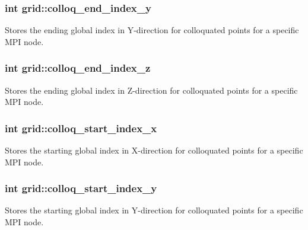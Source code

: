 \subsubsection[{\texorpdfstring{colloq\+\_\+end\+\_\+index\+\_\+y}{colloq_end_index_y}}]{\setlength{\rightskip}{0pt plus 5cm}int grid\+::colloq\+\_\+end\+\_\+index\+\_\+y}\hypertarget{classgrid_abb0480cb2d7fbb17a95502925d706731}{}\label{classgrid_abb0480cb2d7fbb17a95502925d706731}
Stores the ending global index in Y-\/direction for colloquated points for a specific M\+PI node. 
\subsubsection[{\texorpdfstring{colloq\+\_\+end\+\_\+index\+\_\+z}{colloq_end_index_z}}]{\setlength{\rightskip}{0pt plus 5cm}int grid\+::colloq\+\_\+end\+\_\+index\+\_\+z}\hypertarget{classgrid_ad56fd8b3690637ece99545c81e3f6942}{}\label{classgrid_ad56fd8b3690637ece99545c81e3f6942}
Stores the ending global index in Z-\/direction for colloquated points for a specific M\+PI node. 
\subsubsection[{\texorpdfstring{colloq\+\_\+start\+\_\+index\+\_\+x}{colloq_start_index_x}}]{\setlength{\rightskip}{0pt plus 5cm}int grid\+::colloq\+\_\+start\+\_\+index\+\_\+x}\hypertarget{classgrid_a099a1e0ad70bd32866294969e886e9d0}{}\label{classgrid_a099a1e0ad70bd32866294969e886e9d0}
Stores the starting global index in X-\/direction for colloquated points for a specific M\+PI node. 
\subsubsection[{\texorpdfstring{colloq\+\_\+start\+\_\+index\+\_\+y}{colloq_start_index_y}}]{\setlength{\rightskip}{0pt plus 5cm}int grid\+::colloq\+\_\+start\+\_\+index\+\_\+y}\hypertarget{classgrid_a562323a98093d6eaf640785d79334208}{}\label{classgrid_a562323a98093d6eaf640785d79334208}
Stores the starting global index in Y-\/direction for colloquated points for a specific M\+PI node. 
